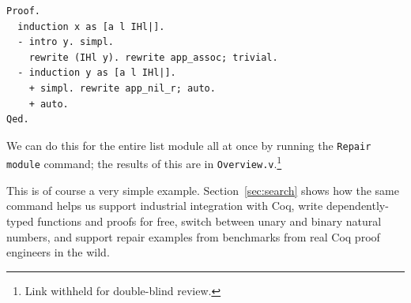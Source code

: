 \begin{lstlisting}
Proof.
  induction x as [a l IHl|].
  - intro y. simpl.
    rewrite (IHl y). rewrite app_assoc; trivial.
  - induction y as [a l IHl|].
    + simpl. rewrite app_nil_r; auto.
    + auto.
Qed.
\end{lstlisting}

We can do this for the entire list module all at once by running the \lstinline{Repair module}
command; the results of this are in \lstinline{Overview.v}.\footnote{Link withheld for double-blind review.}

This is of course a very simple example. Section~\ref{sec:search} shows how the same command
helps us support industrial integration with Coq, write dependently-typed functions and proofs for free,
switch between unary and binary natural numbers, and support repair examples from benchmarks
from real Coq proof engineers in the wild.



